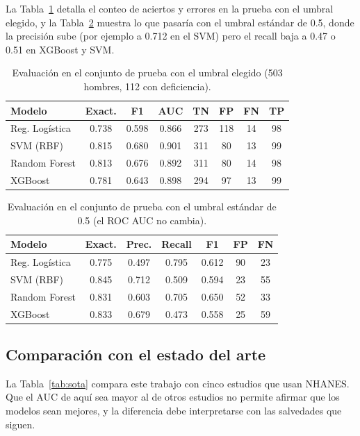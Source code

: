 \documentclass[conference]{IEEEtran}
\begin{document}
La Tabla~\ref{tab:test} detalla el conteo de aciertos y errores en la prueba con el umbral elegido, y la Tabla~\ref{tab:umbral05} muestra lo que pasaría con el umbral estándar de 0.5, donde la precisión sube (por ejemplo a 0.712 en el SVM) pero el recall baja a 0.47 o 0.51 en XGBoost y SVM.

\begin{table}[t]
\centering
\footnotesize
\setlength{\tabcolsep}{3pt}
\caption{Evaluación en el conjunto de prueba con el umbral elegido (503 hombres, 112 con deficiencia).}
\label{tab:test}
\begin{tabular}{l c c c c c c c}
\toprule
Modelo & Exact. & F1 & AUC & TN & FP & FN & TP \\
\midrule
Reg. Logística & 0.738 & 0.598 & 0.866 & 273 & 118 & 14 & 98 \\
SVM (RBF) & 0.815 & 0.680 & 0.901 & 311 & 80 & 13 & 99 \\
Random Forest & 0.813 & 0.676 & 0.892 & 311 & 80 & 14 & 98 \\
XGBoost & 0.781 & 0.643 & 0.898 & 294 & 97 & 13 & 99 \\
\bottomrule
\end{tabular}
\end{table}

\begin{table}[t]
\centering
\footnotesize
\setlength{\tabcolsep}{3pt}
\caption{Evaluación en el conjunto de prueba con el umbral estándar de 0.5 (el ROC AUC no cambia).}
\label{tab:umbral05}
\begin{tabular}{l c c c c c c}
\toprule
Modelo & Exact. & Prec. & Recall & F1 & FP & FN \\
\midrule
Reg. Logística & 0.775 & 0.497 & 0.795 & 0.612 & 90 & 23 \\
SVM (RBF) & 0.845 & 0.712 & 0.509 & 0.594 & 23 & 55 \\
Random Forest & 0.831 & 0.603 & 0.705 & 0.650 & 52 & 33 \\
XGBoost & 0.833 & 0.679 & 0.473 & 0.558 & 25 & 59 \\
\bottomrule
\end{tabular}
\end{table}

\subsection{Comparación con el estado del arte}

La Tabla~\ref{tab:sota} compara este trabajo con cinco estudios que usan NHANES. Que el AUC de aquí sea mayor al de otros estudios no permite afirmar que los modelos sean mejores, y la diferencia debe interpretarse con las salvedades que siguen.
\end{document}
